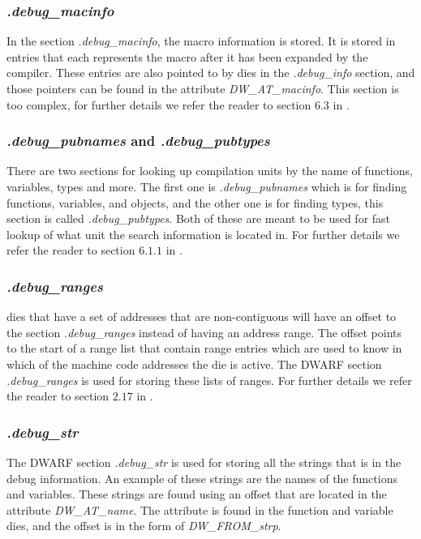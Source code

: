 \subsubsection{\emph{.debug\_macinfo}}
In the section \emph{.debug\_macinfo}, the macro information is stored.
It is stored in entries that each represents the macro after it has been expanded by the compiler.
These entries are also pointed to by \glspl{die} in the \emph{.debug\_info} section, and those pointers can be found in the attribute \emph{DW\_AT\_macinfo}.
This section is too complex, for further details we refer the reader to section $6.3$ in \cite{dwarf}.


\subsubsection{\emph{.debug\_pubnames} and \emph{.debug\_pubtypes}}
There are two sections for looking up compilation units by the name of functions, variables, types and more.
The first one is \emph{.debug\_pubnames} which is for finding functions, variables, and objects, and the other one is for finding types, this section is called \emph{.debug\_pubtypes}.
Both of these are meant to be used for fast lookup of what unit the search information is located in.
For further details we refer the reader to section $6.1.1$ in \cite{dwarf}.


\subsubsection{\emph{.debug\_ranges}}
\Glspl{die} that have a set of addresses that are non-contiguous will have an offset to the section \emph{.debug\_ranges} instead of having an address range.
The offset points to the start of a range list that contain range entries which are used to know in which of the machine code addresses the \gls{die} is active.
The \gls{DWARF} section \emph{.debug\_ranges} is used for storing these lists of ranges.
For further details we refer the reader to section $2.17$ in \cite{dwarf}.


\subsubsection{\emph{.debug\_str}}
The \gls{DWARF} section \emph{.debug\_str} is used for storing all the strings that is in the debug information.
An example of these strings are the names of the functions and variables.
These strings are found using an offset that are located in the attribute \emph{DW\_AT\_name}.
The attribute is found in the function and variable \glspl{die}, and the offset is in the form of \emph{DW\_FROM\_strp}.


